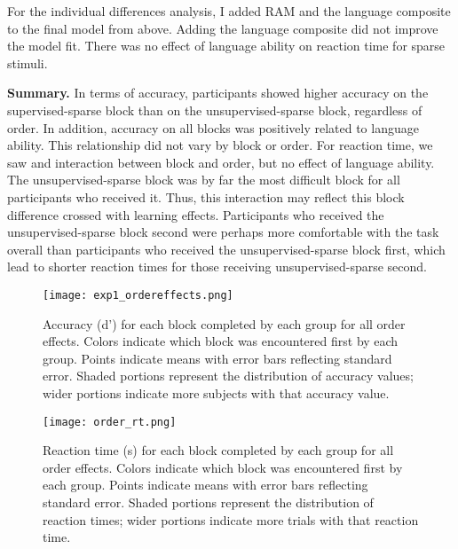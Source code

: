 \documentclass[../dissertation.tex]{subfiles}
\begin{document}
	For the individual differences analysis, I added RAM and the language composite to the final model from above. Adding the language composite did not improve the model fit. There was no effect of language ability on reaction time for sparse stimuli. \par
	\textbf{Summary.} In terms of accuracy, participants showed higher accuracy on the supervised-sparse block than on the unsupervised-sparse block, regardless of order. In addition, accuracy on all blocks was positively related to language ability. This relationship did not vary by block or order. For reaction time, we saw and interaction between block and order, but no effect of language ability. The unsupervised-sparse block was by far the most difficult block for all participants who received it. Thus, this interaction may reflect this block difference crossed with learning effects. Participants who received the unsupervised-sparse block second were perhaps more comfortable with the task overall than participants who received the unsupervised-sparse block first, which lead to shorter reaction times for those receiving unsupervised-sparse second.
	
\begin{figure}[H]
\vspace{-10pt}
\texttt{[image: exp1\_ordereffects.png]}
\caption[Accuracy plot for all order effects]{Accuracy (d') for each block completed by each group for all order effects. Colors indicate which block was encountered first by each group. Points indicate means with error bars reflecting standard error. Shaded portions represent the distribution of accuracy values; wider portions indicate more subjects with that accuracy value.}
\label{oes}
\vspace{-10pt}
\end{figure}	

\begin{figure}[H]
\vspace{-10pt}
\texttt{[image: order\_rt.png]}
\caption[Reaction time plot for all order effects]{Reaction time (s) for each block completed by each group for all order effects. Colors indicate which block was encountered first by each group. Points indicate means with error bars reflecting standard error. Shaded portions represent the distribution of reaction times; wider portions indicate more trials with that reaction time.}
\label{oe_rt}
\vspace{-10pt}
\end{figure}	
\end{document}
